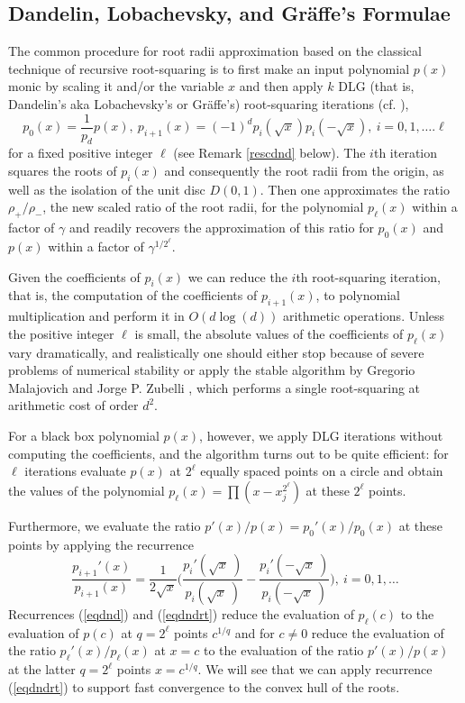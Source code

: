 \documentclass[runningheads]{llncs}
\begin{document}
\subsection{Dandelin, Lobachevsky, and Gr{\"a}ffe's Formulae}\label{subsec:DLG_form}
 The common procedure for root radii  approximation based on the classical technique of recursive root-squaring is to first make an input polynomial $p(x)$ monic by scaling it and/or the variable
  $x$ and then
 apply $k$ DLG (that is, Dandelin's aka
Lobachevsky's or Gr{\"a}ffe's) root-squaring iterations
(cf. \cite{10.2307/2310626}),
\begin{equation}\label{eqdnd}
 p_0(x)=\frac{1}{p_d}p(x),~p_{i+1}(x)=(-1)^ dp_i(\sqrt x)
p_i(-\sqrt x),~i=0,1,\dots.\ell
\end{equation}
for a fixed positive integer $\ell$
(see Remark \ref{rescdnd} below).
The $i$th  iteration squares the roots of $p_i(x)$ and
consequently the root radii from the origin, as well as
the  isolation of the unit disc $D(0,1)$.
Then one approximates
the ratio  $\rho_+/\rho_-$, the new scaled ratio of the root radii, for the polynomial $p_{\ell}(x)$ within a factor of $\gamma$ and readily recovers the approximation of this ratio for $p_0(x)$ and
$p(x)$ within a factor of
$\gamma^{1/2^{\ell}}$.

Given the coefficients of
$p_i(x)$
we can reduce the $i$th root-squaring iteration, that is, the computation of
the coefficients of  $p_{i+1}(x)$, to polynomial multiplication and perform it in $O(d\log(d))$ arithmetic operations.
Unless the positive integer $\ell$ is small, the absolute values of the coefficients
of $p_{\ell}(x)$ vary  dramatically, and realistically one should either stop because of severe problems of numerical stability or apply the stable algorithm by Gregorio Malajovich and Jorge  P. Zubelli \cite{Malajovich2001OnTG}, which performs a single root-squaring at  arithmetic cost of order $d^2$.

For a black box polynomial $p(x)$, however, we apply DLG iterations without computing the coefficients, and the algorithm turns out to be quite efficient:
 for $\ell$ iterations  evaluate
 $p(x)$ at  $2^{\ell}$ equally spaced points on a circle and obtain
 the values of the polynomial $p_{\ell}(x)=\prod\left(x-x_j^{2^{\ell}}\right)$
 at these $2^{\ell}$ points.

Furthermore, we evaluate the ratio
$p'(x)/p(x)=p_0'(x)/p_0(x)$
at these points by applying
the recurrence
 \begin{equation}\label{eqdndrt} \frac{p_{i+1}'(x)}{p_{i+1}(x)}=\frac{1}{2\sqrt x}\Bigg(\frac{p_{i}'(\sqrt x~)}{p_{i}(\sqrt x~)}-\frac{p_{i}'(-\sqrt x~)}{p_{i}(-\sqrt x~)}\Bigg),~i=0,1,\dots
\end{equation}
Recurrences (\ref{eqdnd}) and (\ref{eqdndrt}) reduce the evaluation  of  $p_{\ell}(c)$ to the evaluation of $p(c)$ at  $q=2^{\ell}$  points
$c^{1/q}$ and  for $c\neq 0$ reduce the evaluation of the ratio
$p_{\ell}'(x)/p_{\ell}(x)$ at $x=c$ to the evaluation
of the ratio
$p'(x)/p(x)$ at the latter $q=2^{\ell}$ points $x=c^{1/q}$.
We will see that we can apply  recurrence (\ref{eqdndrt})
to support fast convergence to the convex hull of the roots.
\end{document}

